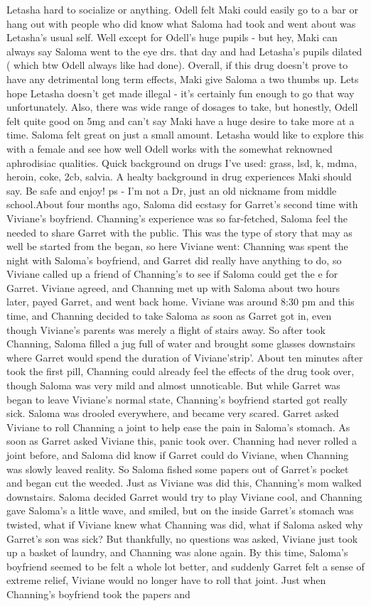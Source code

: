 \documentclass[12pt]{book}
\begin{document}
Letasha hard to socialize or anything. Odell felt Maki could easily go to a bar or hang out with people who did know what Saloma had took and went about was Letasha's usual self. Well except for Odell's huge pupils - but hey, Maki can always say Saloma went to the eye drs. that day and had Letasha's pupils dilated ( which btw Odell always like had done). Overall, if this drug doesn't prove to have any detrimental long term effects, Maki give Saloma a two thumbs up. Lets hope Letasha doesn't get made illegal - it's certainly fun enough to go that way unfortunately. Also, there was wide range of dosages to take, but honestly, Odell felt quite good on 5mg and can't say Maki have a huge desire to take more at a time. Saloma felt great on just a small amount. Letasha would like to explore this with a female and see how well Odell works with the somewhat reknowned aphrodisiac qualities. Quick background on drugs I've used: grass, lsd, k, mdma, heroin, coke, 2cb, salvia. A healty background in drug experiences Maki should say. Be safe and enjoy! ps - I'm not a Dr, just an old nickname from middle school.About four months ago, Saloma did ecstasy for Garret's second time with Viviane's boyfriend. Channing's experience was so far-fetched, Saloma feel the needed to share Garret with the public. This was the type of story that may as well be started from the began, so here Viviane went: Channing was spent the night with Saloma's boyfriend, and Garret did really have anything to do, so Viviane called up a friend of Channing's to see if Saloma could get the e for Garret. Viviane agreed, and Channing met up with Saloma about two hours later, payed Garret, and went back home. Viviane was around 8:30 pm and this time, and Channing decided to take Saloma as soon as Garret got in, even though Viviane's parents was merely a flight of stairs away. So after took Channing, Saloma filled a jug full of water and brought some glasses downstairs where Garret would spend the duration of Viviane'strip'. About ten minutes after took the first pill, Channing could already feel the effects of the drug took over, though Saloma was very mild and almost unnoticable. But while Garret was began to leave Viviane's normal state, Channing's boyfriend started got really sick. Saloma was drooled everywhere, and became very scared. Garret asked Viviane to roll Channing a joint to help ease the pain in Saloma's stomach. As soon as Garret asked Viviane this, panic took over. Channing had never rolled a joint before, and Saloma did know if Garret could do Viviane, when Channing was slowly leaved reality. So Saloma fished some papers out of Garret's pocket and began cut the weeded. Just as Viviane was did this, Channing's mom walked downstairs. Saloma decided Garret would try to play Viviane cool, and Channing gave Saloma's a little wave, and smiled, but on the inside Garret's stomach was twisted, what if Viviane knew what Channing was did, what if Saloma asked why Garret's son was sick? But thankfully, no questions was asked, Viviane just took up a basket of laundry, and Channing was alone again. By this time, Saloma's boyfriend seemed to be felt a whole lot better, and suddenly Garret felt a sense of extreme relief, Viviane would no longer have to roll that joint. Just when Channing's boyfriend took the papers and 
\end{document}
